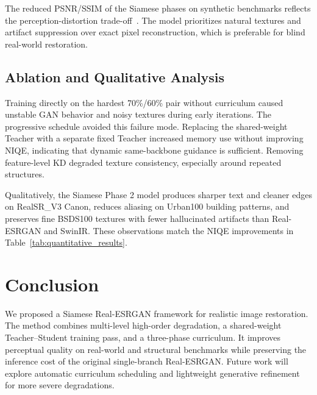 \documentclass[runningheads]{llncs}
\begin{document}
The reduced PSNR/SSIM of the Siamese phases on synthetic benchmarks reflects the perception-distortion trade-off~\cite{blau2018perception}. The model prioritizes natural textures and artifact suppression over exact pixel reconstruction, which is preferable for blind real-world restoration.

\subsection{Ablation and Qualitative Analysis}

Training directly on the hardest 70\%/60\% pair without curriculum caused unstable GAN behavior and noisy textures during early iterations. The progressive schedule avoided this failure mode. Replacing the shared-weight Teacher with a separate fixed Teacher increased memory use without improving NIQE, indicating that dynamic same-backbone guidance is sufficient. Removing feature-level KD degraded texture consistency, especially around repeated structures.

Qualitatively, the Siamese Phase 2 model produces sharper text and cleaner edges on RealSR\_V3 Canon, reduces aliasing on Urban100 building patterns, and preserves fine BSDS100 textures with fewer hallucinated artifacts than Real-ESRGAN and SwinIR. These observations match the NIQE improvements in Table~\ref{tab:quantitative_results}.

\section{Conclusion}

We proposed a Siamese Real-ESRGAN framework for realistic image restoration. The method combines multi-level high-order degradation, a shared-weight Teacher--Student training pass, and a three-phase curriculum. It improves perceptual quality on real-world and structural benchmarks while preserving the inference cost of the original single-branch Real-ESRGAN. Future work will explore automatic curriculum scheduling and lightweight generative refinement for more severe degradations.



\end{document}
